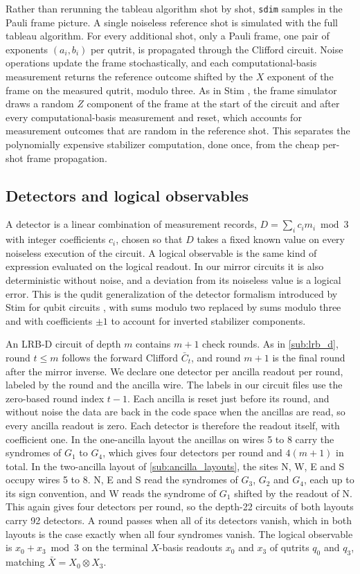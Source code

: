 Rather than rerunning the tableau algorithm shot by shot, \texttt{sdim} samples in the Pauli frame picture. A single noiseless reference shot is simulated with the full tableau algorithm. For every additional shot, only a Pauli frame, one pair of exponents $(a_i, b_i)$ per qutrit, is propagated through the Clifford circuit. Noise operations update the frame stochastically, and each computational-basis measurement returns the reference outcome shifted by the $X$ exponent of the frame on the measured qutrit, modulo three. As in Stim \cite{Gidney2021Stim}, the frame simulator draws a random $Z$ component of the frame at the start of the circuit and after every computational-basis measurement and reset, which accounts for measurement outcomes that are random in the reference shot. This separates the polynomially expensive stabilizer computation, done once, from the cheap per-shot frame propagation.

\subsection{Detectors and logical observables}

A detector is a linear combination of measurement records, $D = \sum_i c_i m_i \bmod 3$ with integer coefficients $c_i$, chosen so that $D$ takes a fixed known value on every noiseless execution of the circuit. A logical observable is the same kind of expression evaluated on the logical readout. In our mirror circuits it is also deterministic without noise, and a deviation from its noiseless value is a logical error. This is the qudit generalization of the detector formalism introduced by Stim for qubit circuits \cite{Gidney2021Stim}, with sums modulo two replaced by sums modulo three and with coefficients $\pm 1$ to account for inverted stabilizer components.

An LRB-D circuit of depth $m$ contains $m+1$ check rounds. As in \autoref{sub:lrb_d}, round $t \le m$ follows the forward Clifford $\bar C_t$, and round $m+1$ is the final round after the mirror inverse. We declare one detector per ancilla readout per round, labeled by the round and the ancilla wire. The labels in our circuit files use the zero-based round index $t - 1$. Each ancilla is reset just before its round, and without noise the data are back in the code space when the ancillas are read, so every ancilla readout is zero. Each detector is therefore the readout itself, with coefficient one. In the one-ancilla layout the ancillas on wires 5 to 8 carry the syndromes of $G_1$ to $G_4$, which gives four detectors per round and $4(m+1)$ in total. In the two-ancilla layout of \autoref{sub:ancilla_layouts}, the sites N, W, E and S occupy wires 5 to 8. N, E and S read the syndromes of $G_3$, $G_2$ and $G_4$, each up to its sign convention, and W reads the syndrome of $G_1$ shifted by the readout of N. This again gives four detectors per round, so the depth-22 circuits of both layouts carry 92 detectors. A round passes when all of its detectors vanish, which in both layouts is the case exactly when all four syndromes vanish. The logical observable is $x_0 + x_3 \bmod 3$ on the terminal $X$-basis readouts $x_0$ and $x_3$ of qutrits $q_0$ and $q_3$, matching $\bar{X} = X_0 \otimes X_3$.

